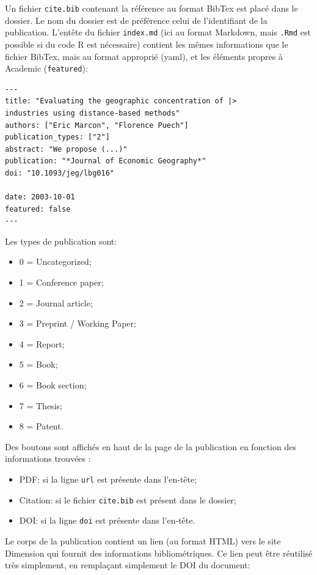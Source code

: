 \documentclass[
  12pt,
  french,
  a4paper,
  extrafontsizes,onecolumn,openright
  ]{memoir}
\providecommand{\tightlist}{%
  \setlength{\itemsep}{0pt}\setlength{\parskip}{0pt}}
\begin{document}
Un fichier \texttt{cite.bib} contenant la référence au format BibTex est placé dans le dossier.
Le nom du dossier est de préférence celui de l'identifiant de la publication.
L'entête du fichier \texttt{index.md} (ici au format Markdown, mais \texttt{.Rmd} est possible si du code R est nécessaire) contient les mêmes informations que le fichier BibTex, mais au format approprié (yaml), et les éléments propres à Academic (\texttt{featured}):

\begin{verbatim}
---
title: "Evaluating the geographic concentration of |>
industries using distance-based methods"
authors: ["Eric Marcon", "Florence Puech"]
publication_types: ["2"]
abstract: "We propose (...)"
publication: "*Journal of Economic Geography*"
doi: "10.1093/jeg/lbg016"

date: 2003-10-01
featured: false
---
\end{verbatim}

Les types de publication sont:

\begin{itemize}
\tightlist
\item
  0 = Uncategorized;
\item
  1 = Conference paper;
\item
  2 = Journal article;
\item
  3 = Preprint / Working Paper;
\item
  4 = Report;
\item
  5 = Book;
\item
  6 = Book section;
\item
  7 = Thesis;
\item
  8 = Patent.
\end{itemize}

Des boutons sont affichés en haut de la page de la publication en fonction des informations trouvées :

\begin{itemize}
\tightlist
\item
  PDF: si la ligne \texttt{url} est présente dans l'en-tête;
\item
  Citation: si le fichier \texttt{cite.bib} est présent dans le dossier;
\item
  DOI: si la ligne \texttt{doi} est présente dans l'en-tête.
\end{itemize}

Le corps de la publication contient un lien (au format HTML) vers le site Dimension qui fournit des informations bibliométriques.
Ce lien peut être réutilisé très simplement, en remplaçant simplement le DOI du document:
\end{document}
